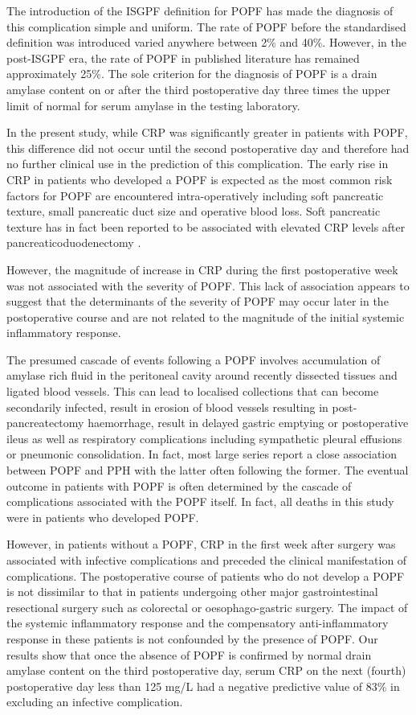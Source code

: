 The introduction of the ISGPF definition for POPF has made the diagnosis of this complication simple and uniform. The rate of POPF before the standardised definition was introduced varied anywhere between 2\% and 40\%. However, in the post-ISGPF era, the rate of POPF in published literature has remained approximately 25\%. The sole criterion for the diagnosis of POPF is a drain amylase content on or after the third postoperative day three times the upper limit of normal for serum amylase in the testing laboratory. 

In the present study, while CRP was significantly greater in patients with POPF, this difference did not occur until the second postoperative day and therefore had no further clinical use in the prediction of this complication. The early rise in CRP in patients who developed a POPF is expected as the most common risk factors for POPF are encountered intra-operatively including soft pancreatic texture, small pancreatic duct size and operative blood loss. Soft pancreatic texture has in fact been reported to be associated with elevated CRP levels after pancreaticoduodenectomy \parencite{murakami_soft_2008}.

However, the magnitude of increase in CRP during the first postoperative week was not associated with the severity of POPF. This lack of association appears to suggest that the determinants of the severity of POPF may occur later in the postoperative course and are not related to the magnitude of the initial systemic inflammatory response.

The presumed cascade of events following a POPF involves accumulation of amylase rich fluid in the peritoneal cavity around recently dissected tissues and ligated blood vessels. This can lead to localised collections that can become secondarily infected, result in erosion of blood vessels resulting in post-pancreatectomy haemorrhage, result in delayed gastric emptying or postoperative ileus as well as respiratory complications including sympathetic pleural effusions or pneumonic consolidation. In fact, most large series report a close association between POPF and PPH with the latter often following the former. The eventual outcome in patients with POPF is often determined by the cascade of complications associated with the POPF itself. In fact, all deaths in this study were in patients who developed POPF.

However, in patients without a POPF, CRP in the first week after surgery was associated with infective complications and preceded the clinical manifestation of complications. The postoperative course of patients who do not develop a POPF is not dissimilar to that in patients undergoing other major gastrointestinal resectional surgery such as colorectal or oesophago-gastric surgery. The impact of the systemic inflammatory response and the compensatory anti-inflammatory response in these patients is not confounded by the presence of POPF. Our results show that once the absence of POPF is confirmed by normal drain amylase content on the third postoperative day, serum CRP on the next (fourth) postoperative day less than 125 mg/L had a negative predictive value of 83\% in excluding an infective complication. 

